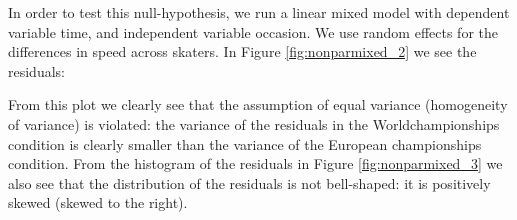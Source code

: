 In order to test this null-hypothesis, we run a linear mixed model with dependent variable time, and independent variable occasion. We use random effects for the differences in speed across skaters. In Figure \ref{fig:nonparmixed_2} we see the residuals:

\begin{knitrout}
\color{fgcolor}\begin{kframe}


{\ttfamily\noindent\bfseries{}}

{\ttfamily\noindent\bfseries\color{errorcolor}{\#\# Error in cbind(datalong, res): object 'datalong' not found}}

{\ttfamily\noindent\bfseries{}}\end{kframe}
\end{knitrout}

From this plot we clearly see that the assumption of equal variance (homogeneity of variance) is violated: the variance of the residuals in the Worldchampionships condition is clearly smaller than the variance of the European championships condition. From the histogram of the residuals in Figure \ref{fig:nonparmixed_3} we also see that the distribution of the residuals is not bell-shaped: it is positively skewed (skewed to the right).




